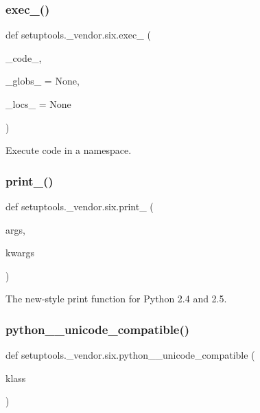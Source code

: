\subsubsection{\texorpdfstring{exec\+\_\+()}{exec\_()}}
{\footnotesize\ttfamily def setuptools.\+\_\+vendor.\+six.\+exec\+\_\+ (\begin{DoxyParamCaption}\item[{}]{\+\_\+code\+\_\+,  }\item[{}]{\+\_\+globs\+\_\+ = {\ttfamily None},  }\item[{}]{\+\_\+locs\+\_\+ = {\ttfamily None} }\end{DoxyParamCaption})}

\begin{DoxyVerb}Execute code in a namespace.\end{DoxyVerb}
 \mbox{\label{namespacesetuptools_1_1__vendor_1_1six_a26fe6e846f37b3d30891c9e855598a8b}} 
\subsubsection{\texorpdfstring{print\+\_\+()}{print\_()}}
{\footnotesize\ttfamily def setuptools.\+\_\+vendor.\+six.\+print\+\_\+ (\begin{DoxyParamCaption}\item[{}]{args,  }\item[{}]{kwargs }\end{DoxyParamCaption})}

\begin{DoxyVerb}The new-style print function for Python 2.4 and 2.5.\end{DoxyVerb}
 \mbox{\label{namespacesetuptools_1_1__vendor_1_1six_a5b0c006d53a3cf81ffae1823a3617f0f}} 
\subsubsection{\texorpdfstring{python\+\_\+\_\+unicode\+\_\+compatible()}{python\_2\_unicode\_compatible()}}
{\footnotesize\ttfamily def setuptools.\+\_\+vendor.\+six.\+python\+\_\+\_\+unicode\+\_\+compatible (\begin{DoxyParamCaption}\item[{}]{klass }\end{DoxyParamCaption})}

